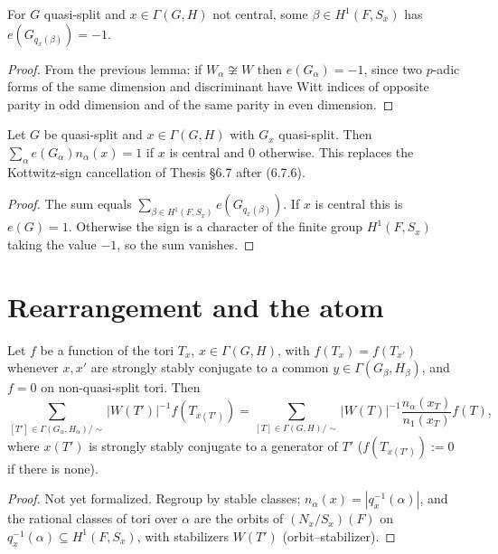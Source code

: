 \begin{lemma}
\label{exists_twistIdx_kottwitzSign_neg}
\leanok
{}
For $G$ quasi-split and $x\in\Gamma(G,H)$ not central, some $\beta\in H^1(F,S_x)$ has $e(G_{q_x(\beta)})=-1$.
\end{lemma}
\begin{proof}
\leanok
{}
From the previous lemma: if $W_\alpha\not\cong W$ then $e(G_\alpha)=-1$, since two $p$-adic forms of the same dimension and discriminant have Witt indices of opposite parity in odd dimension and of the same parity in even dimension.
\end{proof}

\begin{theorem}
\label{signed_count}
\leanok
{}
Let $G$ be quasi-split and $x\in\Gamma(G,H)$ with $G_x$ quasi-split. Then
$\sum_\alpha e(G_\alpha)n_\alpha(x)=1$ if $x$ is central and $0$ otherwise.
This replaces the Kottwitz-sign cancellation of Thesis \S6.7 after (6.7.6).
\end{theorem}
\begin{proof}
\leanok
{}
The sum equals $\sum_{\beta\in H^1(F,S_x)}e(G_{q_x(\beta)})$. If $x$ is central this is $e(G)=1$. Otherwise the
sign is a character of the finite group $H^1(F,S_x)$ taking the value $-1$, so the sum vanishes.
\end{proof}

\section{Rearrangement and the atom}
\begin{lemma}
\label{torusClass_count}
\leanok
{}
Let $f$ be a function of the tori $T_x$, $x\in\Gamma(G,H)$, with $f(T_x)=f(T_{x'})$ whenever $x,x'$ are
strongly stably conjugate to a common $y\in\Gamma(G_\beta,H_\beta)$, and $f=0$ on non-quasi-split tori. Then
\[ \sum_{[T']\in\Gamma(G_\alpha,H_\alpha)/\sim}|W(T')|^{-1}f(T_{x(T')})=\sum_{[T]\in\Gamma(G,H)/\sim}|W(T)|^{-1}
\frac{n_\alpha(x_T)}{n_1(x_T)}f(T), \]
where $x(T')$ is strongly stably conjugate to a generator of $T'$ ($f(T_{x(T')}) := 0$ if there is none).
\end{lemma}
\begin{proof}
Not yet formalized. Regroup by stable classes; $n_\alpha(x)=|q_x^{-1}(\alpha)|$, and the rational classes of
tori over $\alpha$ are the orbits of $(N_x/S_x)(F)$ on $q_x^{-1}(\alpha)\subseteq H^1(F,S_x)$, with
stabilizers $W(T')$ (orbit--stabilizer).
\end{proof}

